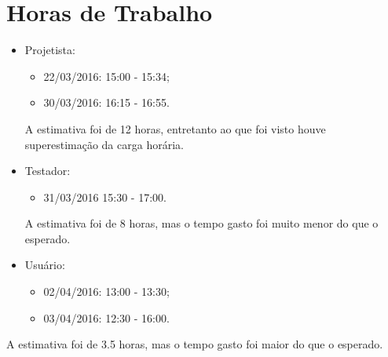 \documentclass[12pt,a4paper,final]{article}
\begin{document}
\section{Horas de Trabalho}
\begin{itemize}
\item Projetista:
\begin{itemize}
\item 22/03/2016: 15:00 - 15:34;
\item 30/03/2016: 16:15 - 16:55.
\end{itemize}
A estimativa foi de 12  horas, entretanto ao que foi visto houve superestimação da carga horária.

\item Testador: 
\begin{itemize}
\item 31/03/2016 15:30 - 17:00.
\end{itemize}
A estimativa foi de 8 horas, mas o tempo gasto foi muito menor do que o esperado.  

\item Usuário:
\begin{itemize}
\item 02/04/2016: 13:00 - 13:30;
\item 03/04/2016: 12:30 - 16:00.
\end{itemize}
\end{itemize}
A estimativa foi de 3.5 horas, mas o tempo gasto foi maior do que o esperado. 
\end{document}

